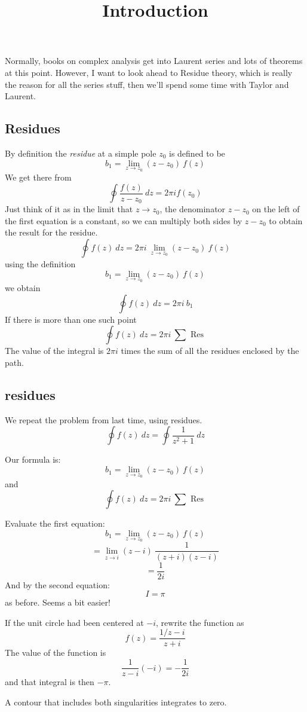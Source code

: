 \documentclass[11pt, oneside]{article}
\title{Introduction}
\date{}
\begin{document}
\maketitle
\Large

Normally, books on complex analysis get into Laurent series and lots of theorems at this point.  However, I want to look ahead to Residue theory, which is really the reason for all the series stuff, then we'll spend some time with Taylor and Laurent.

\subsection*{Residues}
By definition the \emph{residue} at a simple pole $z_0$ is defined to be
\[ b_1 = \lim_{z \rightarrow z_0} (z-z_0) \ f(z)  \]
We get there from 
\[  \oint \frac{f(z)}{z - z_0} \ dz = 2 \pi i f(z_0) \]
Just think of it as in the limit that $z \rightarrow z_0$, the denominator $z-z_0$ on the left of the first equation is a constant, so we can multiply both sides by $z - z_0$
to obtain the result for the residue.
\[ \oint f(z) \ dz = 2 \pi i \ \lim_{z \rightarrow z_0} (z-z_0) \ f(z)  \]
using the definition
\[ b_1 = \lim_{z \rightarrow z_0} (z-z_0) \ f(z)  \]
we obtain
\[ \oint f(z) \ dz = 2 \pi i \ b_1  \]
If there is more than one such point
\[ \oint f(z) \ dz = 2 \pi i \ \sum \text{ Res } \]
The value of the integral is $2 \pi i$ times the sum of all the residues enclosed by the path.

\subsection*{residues}
We repeat the problem from last time, using residues.  
\[ \oint f(z) \ dz = \oint \frac{1}{z^2 + 1} \ dz \]

Our formula is:
\[ b_1 = \lim_{z \rightarrow z_0} (z-z_0) \ f(z)  \]
and
\[ \oint f(z) \ dz = 2 \pi i \ \sum \text{ Res } \]

Evaluate the first equation:
\[ b_1 = \lim_{z \rightarrow z_0} (z-z_0) \ f(z)  \]
\[ = \lim_{z \rightarrow i} (z-i) \  \frac{1}{(z+i)(z-i)} \]
\[ = \frac{1}{2i} \]
And by the second equation:
\[ I = \pi \]
as before.  Seems a bit easier!

If the unit circle had been centered at $-i$, rewrite the function as
\[ f(z) = \frac{1/z-i}{z+i} \]
The value of the function is
\[ \frac{1}{z-i}(-i) = -\frac{1}{2i} \]
and that integral is then $- \pi$.

A contour that includes both singularities integrates to zero.
\end{document}
